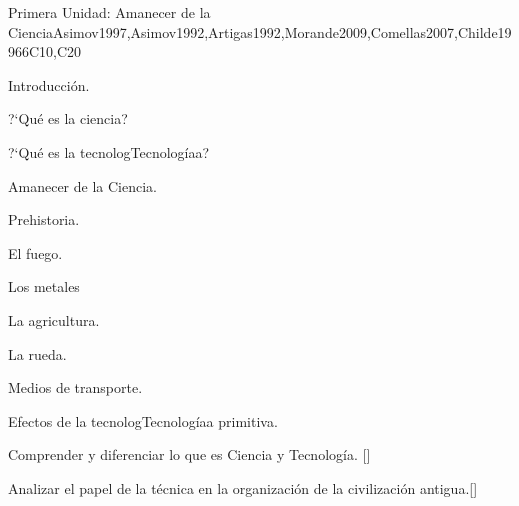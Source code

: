 \begin{syllabus}
\begin{unit}{}{Primera Unidad: Amanecer de la Ciencia}{Asimov1997,Asimov1992,Artigas1992,Morande2009,Comellas2007,Childe1996}{6}{C10,C20}
\begin{topics}
  \item Introducción.
    \begin{subtopics}
      \item ?`Qué es la ciencia?
      \item ?`Qué es la tecnologTecnologíaa?
    \end{subtopics}
  \item Amanecer de la Ciencia.
    \begin{subtopics}
      \item Prehistoria.
      \item El fuego.
      \item Los metales
      \item La agricultura.
      \item La rueda.
      \item Medios de transporte.
      \item Efectos de la tecnologTecnologíaa primitiva.
    \end{subtopics}
\end{topics}
\begin{learningoutcomes}
	\item Comprender y diferenciar lo que es Ciencia y Tecnología. [\Familiarity]
	\item Analizar el papel de la técnica en la organización de la civilización antigua.[\Familiarity]
\end{learningoutcomes}
\end{unit}


\end{syllabus}
